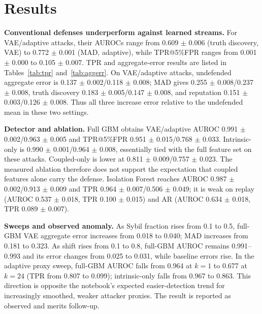 \documentclass[conference]{IEEEtran}
\begin{document}
\section{Results}
\textbf{Conventional defenses underperform against learned streams.} For VAE/adaptive attacks, their AUROCs range from 0.609 $\pm$ 0.006 (truth discovery, VAE) to 0.772 $\pm$ 0.001 (MAD, adaptive), while TPR@5\%FPR ranges from 0.001 $\pm$ 0.000 to 0.105 $\pm$ 0.007. TPR and aggregate-error results are listed in Tables~\ref{tab:tpr} and~\ref{tab:aggerr}. On VAE/adaptive attacks, undefended aggregate error is 0.137 $\pm$ 0.002/0.118 $\pm$ 0.008; MAD gives 0.255 $\pm$ 0.008/0.237 $\pm$ 0.008, truth discovery 0.183 $\pm$ 0.005/0.147 $\pm$ 0.008, and reputation 0.151 $\pm$ 0.003/0.126 $\pm$ 0.008. Thus all three increase error relative to the undefended mean in these two settings.

\textbf{Detector and ablation.} Full GBM obtains VAE/adaptive AUROC 0.991 $\pm$ 0.002/0.963 $\pm$ 0.005 and TPR@5\%FPR 0.951 $\pm$ 0.015/0.768 $\pm$ 0.033. Intrinsic-only is 0.990 $\pm$ 0.001/0.964 $\pm$ 0.008, essentially tied with the full feature set on these attacks. Coupled-only is lower at 0.811 $\pm$ 0.009/0.757 $\pm$ 0.023. The measured ablation therefore does not support the expectation that coupled features alone carry the defense. Isolation Forest reaches AUROC 0.987 $\pm$ 0.002/0.913 $\pm$ 0.009 and TPR 0.964 $\pm$ 0.007/0.506 $\pm$ 0.049; it is weak on replay (AUROC 0.537 $\pm$ 0.018, TPR 0.100 $\pm$ 0.015) and AR (AUROC 0.634 $\pm$ 0.018, TPR 0.089 $\pm$ 0.007).

\textbf{Sweeps and observed anomaly.} As Sybil fraction rises from 0.1 to 0.5, full-GBM VAE aggregate error increases from 0.018 to 0.040; MAD increases from 0.181 to 0.323. As shift rises from 0.1 to 0.8, full-GBM AUROC remains 0.991--0.993 and its error changes from 0.025 to 0.031, while baseline errors rise. In the adaptive proxy sweep, full-GBM AUROC falls from 0.964 at $k{=}1$ to 0.677 at $k{=}24$ (TPR from 0.807 to 0.099); intrinsic-only falls from 0.967 to 0.863. This direction is opposite the notebook's expected easier-detection trend for increasingly smoothed, weaker attacker proxies. The result is reported as observed and merits follow-up.
\end{document}

